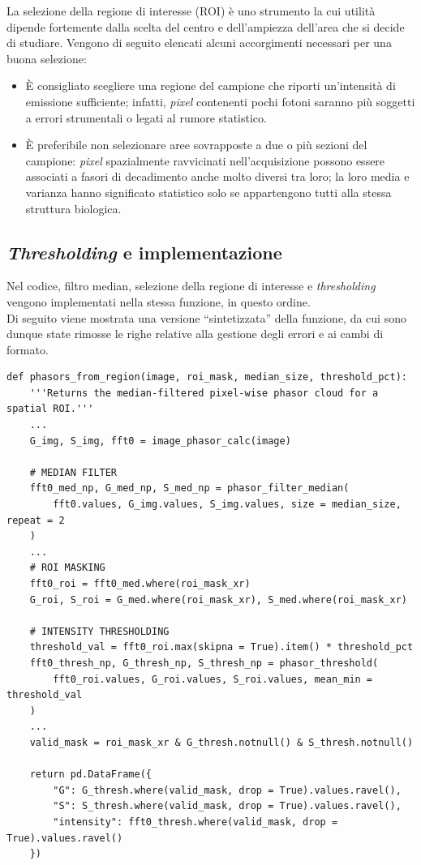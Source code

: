 La selezione della regione di interesse (ROI) è uno strumento la cui utilità dipende fortemente dalla scelta del centro e dell'ampiezza dell'area che si decide di studiare. Vengono di seguito elencati alcuni accorgimenti necessari per una buona selezione:
\begin{itemize}
    \item È consigliato scegliere una regione del campione che riporti un'intensità di emissione sufficiente; infatti, \textit{pixel} contenenti pochi fotoni saranno più soggetti a errori strumentali o legati al rumore statistico.
    \item È preferibile non selezionare aree sovrapposte a due o più sezioni del campione: \textit{pixel} spazialmente ravvicinati nell'acquisizione possono essere associati a fasori di decadimento anche molto diversi tra loro; la loro media e varianza hanno significato statistico solo se appartengono tutti alla stessa struttura biologica.
\end{itemize}




\subsection{\textit{Thresholding} e implementazione}
\label{sec:thresholding_e_implementazione}

Nel codice, filtro median, selezione della regione di interesse e \textit{thresholding} vengono implementati nella stessa funzione, in questo ordine.\\
Di seguito viene mostrata una versione ``sintetizzata'' della funzione, da cui sono dunque state rimosse le righe relative alla gestione degli errori e ai cambi di formato.

\begin{verbatim}
def phasors_from_region(image, roi_mask, median_size, threshold_pct):
    '''Returns the median-filtered pixel-wise phasor cloud for a spatial ROI.'''
    ...
    G_img, S_img, fft0 = image_phasor_calc(image)

    # MEDIAN FILTER 
    fft0_med_np, G_med_np, S_med_np = phasor_filter_median(
        fft0.values, G_img.values, S_img.values, size = median_size, repeat = 2
    )
    ...
    # ROI MASKING
    fft0_roi = fft0_med.where(roi_mask_xr)
    G_roi, S_roi = G_med.where(roi_mask_xr), S_med.where(roi_mask_xr)

    # INTENSITY THRESHOLDING
    threshold_val = fft0_roi.max(skipna = True).item() * threshold_pct
    fft0_thresh_np, G_thresh_np, S_thresh_np = phasor_threshold(
        fft0_roi.values, G_roi.values, S_roi.values, mean_min = threshold_val
    )
    ...
    valid_mask = roi_mask_xr & G_thresh.notnull() & S_thresh.notnull()

    return pd.DataFrame({
        "G": G_thresh.where(valid_mask, drop = True).values.ravel(),
        "S": S_thresh.where(valid_mask, drop = True).values.ravel(),
        "intensity": fft0_thresh.where(valid_mask, drop = True).values.ravel()
    })
\end{verbatim}   

